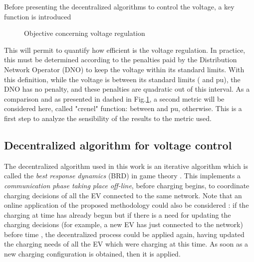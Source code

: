 \documentclass[journal]{IEEEtran}
\begin{document}
Before presenting the decentralized algorithms to control the voltage, a key function is introduced



\begin{figure}[!htbp]
\centering
{}
\caption{Objective concerning voltage regulation}
\label{fig:PhysMetr}
\end{figure}

This will permit to quantify how efficient is the voltage regulation. In practice, this must be determined according to the penalties paid by the Distribution Network Operator (DNO) to keep the voltage within its standard limits. With this definition, while the voltage is between its standard limits ( and  pu), the DNO has no penalty, and these penalties are quadratic out of this interval. As a comparison and as presented in dashed in Fig.\ref{fig:PhysMetr}, a second metric will be considered here, called "crenel" function:  between  and  pu,  otherwise. This is a first step to analyze the sensibility of the results to the metric used.

\subsection{Decentralized algorithm for voltage control}


The decentralized algorithm used in this work is an iterative algorithm which is called the \textit{best response dynamics} (BRD) in game theory \cite{Fudenberg1991}. This implements a \textit{communication phase taking place off-line}, before charging begins, to coordinate charging decisions of all the EV connected to the same network. Note that an online application of the proposed methodology could also be considered : if the charging at time  has already begun but if there is a need for updating the charging decisions (for example, a new EV has just connected to the network) before time , the decentralized process could be applied again, having updated the charging needs of all the EV which were charging at this time. As soon as a new charging configuration is obtained, then it is applied.
\end{document}
